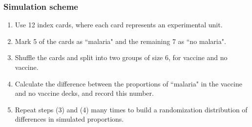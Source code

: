\documentclass[slidestop,compress,mathserif,12pt,t,professionalfonts,xcolor=table]{beamer}
\begin{document}
\begin{frame}
\frametitle{Simulation scheme}

\begin{enumerate}

\item Use 12 index cards, where each card represents an experimental unit.

\pause

\item Mark 5 of the cards as ``malaria" and the remaining 7 as ``no malaria".

\pause

\item Shuffle the cards and split into two groups of size 6, for vaccine and no vaccine.

\pause

\item Calculate the difference between the proportions of ``malaria" in the vaccine and no vaccine decks, and record this number.

\pause

\item Repeat steps (3) and (4) many times to build a randomization distribution of differences in simulated proportions.

\end{enumerate}

\end{frame}

\end{document}
